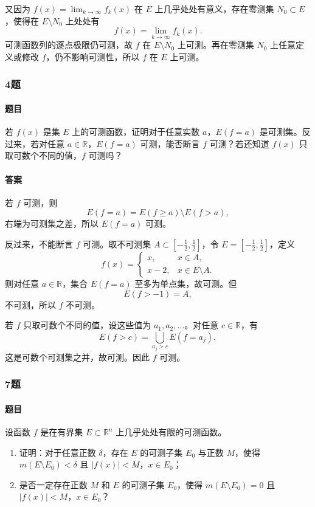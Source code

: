\documentclass{article}
\begin{document}
又因为 $f(x)=\lim_{k\to\infty}f_k(x)$ 在 $E$ 上几乎处处有意义，存在零测集 $N_0\subset E$，使得在 $E\setminus N_0$ 上处处有
\[
 f(x)=\lim_{k\to\infty}f_k(x).
\]
可测函数列的逐点极限仍可测，故 $f$ 在 $E\setminus N_0$ 上可测。再在零测集 $N_0$ 上任意定义或修改 $f$，仍不影响可测性，所以 $f$ 在 $E$ 上可测。

\subsubsection*{4题}
\paragraph{题目} 若 $f(x)$ 是集 $E$ 上的可测函数，证明对于任意实数 $a$，$E(f=a)$ 是可测集。反过来，若对任意 $a\in\mathbb{R}$，$E(f=a)$ 可测，能否断言 $f$ 可测？若还知道 $f(x)$ 只取可数个不同的值，$f$ 可测吗？

\paragraph{答案} 若 $f$ 可测，则
\[
 E(f=a)=E(f\ge a)\setminus E(f>a),
\]
右端为可测集之差，所以 $E(f=a)$ 可测。

反过来，不能断言 $f$ 可测。取不可测集 $A\subset[-\frac12,\frac12]$，令 $E=[-\frac12,\frac12]$，定义
\[
 f(x)=
 \begin{cases}
 x, & x\in A,\\
 x-2, & x\in E\setminus A.
 \end{cases}
\]
则对任意 $a\in\mathbb{R}$，集合 $E(f=a)$ 至多为单点集，故可测。但
\[
 E(f>-1)=A,
\]
不可测，所以 $f$ 不可测。

若 $f$ 只取可数个不同的值，设这些值为 $a_1,a_2,\ldots$。对任意 $c\in\mathbb{R}$，有
\[
 E(f>c)=\bigcup_{a_j>c}E(f=a_j),
\]
这是可数个可测集之并，故可测。因此 $f$ 可测。

\subsubsection*{7题}
\paragraph{题目} 设函数 $f$ 是在有界集 $E\subset\mathbb{R}^n$ 上几乎处处有限的可测函数。
\begin{enumerate}[label=(\arabic*)]
\item 证明：对于任意正数 $\delta$，存在 $E$ 的可测子集 $E_0$ 与正数 $M$，使得 $m(E\setminus E_0)<\delta$ 且 $|f(x)|<M$，$x\in E_0$；
\item 是否一定存在正数 $M$ 和 $E$ 的可测子集 $E_0$，使得 $m(E\setminus E_0)=0$ 且 $|f(x)|<M$，$x\in E_0$？
\end{enumerate}
\end{document}
